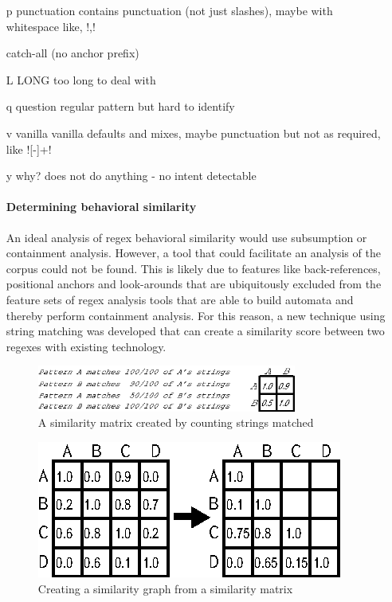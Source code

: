 \begin{itemize}
\item[ p ] punctuation   contains punctuation (not just slashes), maybe with whitespace like, \cverb!\s*,\s*!

catch-all (no anchor prefix)
\item[ L ] LONG        too long to deal with
\item[ q ] question    regular pattern but hard to identify
\item[ v ] vanilla     vanilla defaults and mixes, maybe punctuation but not as required, like \cverb![-\s]+!
\item[ y ] why?        does not do anything - no intent detectable




\paragraph{Determining behavioral similarity} An ideal analysis of regex behavioral similarity would use subsumption or containment analysis. However, a tool that could facilitate an analysis of the corpus could not be found.  This is likely due to features like back-references, positional anchors and look-arounds that are ubiquitously excluded from the feature sets of regex analysis tools that are able to build automata and thereby perform containment analysis.  For this reason, a new technique using string matching was developed that can create a similarity score between two regexes with existing technology.

\begin{figure}[tb]
\centering
\includegraphics[height=0.6in]{nontex/illustrations/minimalMatrix.eps}
\caption{A similarity matrix created by counting strings matched}
\label{fig:minimalMatrix}
\end{figure}

\begin{figure}[tb]
\centering
\includegraphics[width=0.7\columnwidth]{nontex/illustrations/matrixToGraph.eps}
\vspace{-6pt}
\caption{Creating a similarity graph from a similarity matrix}
\vspace{-6pt}
\label{fig:matrixToGraph}
\end{figure}




\end{itemize}
